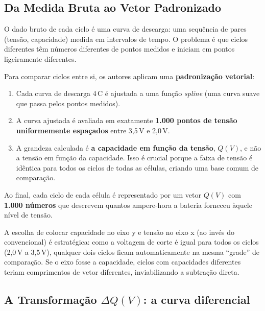 \documentclass[12pt,a4paper]{article}
\begin{document}
\subsection{Da Medida Bruta ao Vetor Padronizado}

O dado bruto de cada ciclo \'{e} uma curva de descarga: uma sequ\^{e}ncia de pares
(tens\~ao, capacidade) medida em intervalos de tempo. O problema \'{e} que ciclos
diferentes t\^{e}m n\'{u}meros diferentes de pontos medidos e iniciam em pontos
ligeiramente diferentes.

Para comparar ciclos entre si, os autores aplicam uma \textbf{padroniza\c{c}\~ao vetorial}:

\begin{enumerate}
  \item Cada curva de descarga 4\,C \'{e} ajustada a uma fun\c{c}\~ao \textit{spline}
    (uma curva suave que passa pelos pontos medidos).
  \item A curva ajustada \'{e} avaliada em exatamente \textbf{1.000 pontos de tens\~ao
    uniformemente espa\c{c}ados} entre 3,5\,V e 2,0\,V.
  \item A grandeza calculada \'{e} \textbf{a capacidade em fun\c{c}\~ao da tens\~ao},
    $Q(V)$, e n\~ao a tens\~ao em fun\c{c}\~ao da capacidade. Isso \'{e} crucial porque
    a faixa de tens\~ao \'{e} id\^{e}ntica para todos os ciclos de todas as c\'{e}lulas,
    criando uma base comum de compara\c{c}\~ao.
\end{enumerate}

Ao final, cada ciclo de cada c\'{e}lula \'{e} representado por um vetor $Q(V)$
com \textbf{1.000 n\'{u}meros} que descrevem quantos ampere-hora a bateria
forneceu \`{a}quele n\'{i}vel de tens\~ao.

\begin{conceito}
A escolha de colocar capacidade no eixo y e tens\~ao no eixo x (ao inv\'{e}s
do convencional) \'{e} estrat\'{e}gica: como a voltagem de corte \'{e} igual para
todos os ciclos (2,0\,V a 3,5\,V), qualquer dois ciclos ficam automaticamente
na mesma ``grade'' de compara\c{c}\~ao. Se o eixo fosse a capacidade, ciclos
com capacidades diferentes teriam comprimentos de vetor diferentes,
inviabilizando a subtra\c{c}\~ao direta.
\end{conceito}

\subsection{A Transforma\c{c}\~ao $\Delta Q(V)$: a curva diferencial}
\end{document}
